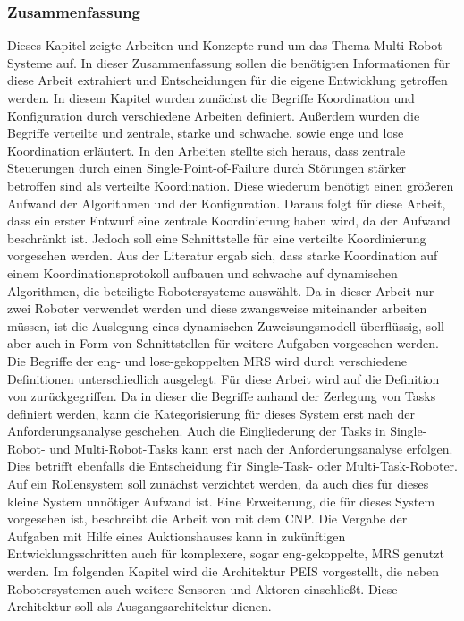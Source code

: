 \subsubsection{Zusammenfassung}
Dieses Kapitel zeigte Arbeiten und Konzepte rund um das Thema Multi-Robot-Systeme auf. In dieser Zusammenfassung sollen die benötigten Informationen für diese Arbeit extrahiert und Entscheidungen für die eigene Entwicklung getroffen werden. In diesem Kapitel wurden zunächst die Begriffe Koordination und Konfiguration durch verschiedene Arbeiten definiert. Außerdem wurden die Begriffe verteilte und zentrale, starke und schwache, sowie enge und lose Koordination erläutert. In den Arbeiten stellte sich heraus, dass zentrale Steuerungen durch einen Single-Point-of-Failure durch Störungen stärker betroffen sind als verteilte Koordination. Diese wiederum benötigt einen größeren Aufwand der Algorithmen und der Konfiguration. Daraus folgt für diese Arbeit, dass ein erster Entwurf eine zentrale Koordinierung haben wird, da der Aufwand beschränkt ist. Jedoch soll eine Schnittstelle für eine verteilte Koordinierung vorgesehen werden. Aus der Literatur ergab sich, dass starke Koordination auf einem Koordinationsprotokoll aufbauen und schwache auf dynamischen Algorithmen, die beteiligte Robotersysteme auswählt. Da in dieser Arbeit nur zwei Roboter verwendet werden und diese zwangsweise miteinander arbeiten müssen, ist die Auslegung eines dynamischen Zuweisungsmodell überflüssig, soll aber auch in Form von Schnittstellen für weitere Aufgaben vorgesehen werden. Die Begriffe der eng- und lose-gekoppelten MRS wird durch verschiedene Definitionen unterschiedlich ausgelegt. Für diese Arbeit wird auf die Definition von \cite{kalra2004hoplites} zurückgegriffen. Da in dieser die Begriffe anhand der Zerlegung von Tasks definiert werden, kann die Kategorisierung für dieses System erst nach der Anforderungsanalyse geschehen. Auch die Eingliederung der Tasks in Single-Robot- und Multi-Robot-Tasks kann erst nach der Anforderungsanalyse erfolgen. Dies betrifft ebenfalls die Entscheidung für Single-Task- oder Multi-Task-Roboter. Auf ein Rollensystem soll zunächst verzichtet werden, da auch dies für dieses kleine System unnötiger Aufwand ist. Eine Erweiterung, die für dieses System vorgesehen ist, beschreibt die Arbeit von \cite{davis2003negotiation} mit dem CNP. Die Vergabe der Aufgaben mit Hilfe eines Auktionshauses kann in zukünftigen Entwicklungsschritten auch für komplexere, sogar eng-gekoppelte, MRS genutzt werden. Im folgenden Kapitel wird die Architektur PEIS vorgestellt, die neben Robotersystemen auch weitere Sensoren und Aktoren einschließt. Diese Architektur soll als Ausgangsarchitektur dienen.